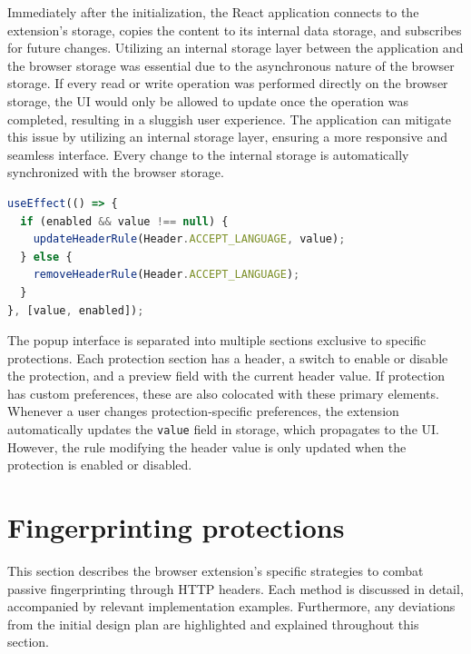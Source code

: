 \medbreak

Immediately after the initialization, the React application connects to the extension's storage, copies the content to its internal data storage, and subscribes for future changes. Utilizing an internal storage layer between the application and the browser storage was essential due to the asynchronous nature of the browser storage. If every read or write operation was performed directly on the browser storage, the UI would only be allowed to update once the operation was completed, resulting in a sluggish user experience. The application can mitigate this issue by utilizing an internal storage layer, ensuring a more responsive and seamless interface. Every change to the internal storage is automatically synchronized with the browser storage.

\bigbreak

\begin{lstlisting}[language={TypeScript}, caption={A part of the code that updates the HTTP header-modifying rule when a protection is enabled or disabled.}]
useEffect(() => {
  if (enabled && value !== null) {
    updateHeaderRule(Header.ACCEPT_LANGUAGE, value);
  } else {
    removeHeaderRule(Header.ACCEPT_LANGUAGE);
  }
}, [value, enabled]);
\end{lstlisting}

\medbreak

The popup interface is separated into multiple sections exclusive to specific protections. Each protection section has a header, a switch to enable or disable the protection, and a preview field with the current header value. If protection has custom preferences, these are also colocated with these primary elements. Whenever a user changes protection-specific preferences, the extension automatically updates the \texttt{value} field in storage, which propagates to the UI. However, the rule modifying the header value is only updated when the protection is enabled or disabled.

\section{Fingerprinting protections}
\label{Section:ProtectionsImplementation}

This section describes the browser extension's specific strategies to combat passive fingerprinting through HTTP headers. Each method is discussed in detail, accompanied by relevant implementation examples. Furthermore, any deviations from the initial design plan are highlighted and explained throughout this section.


